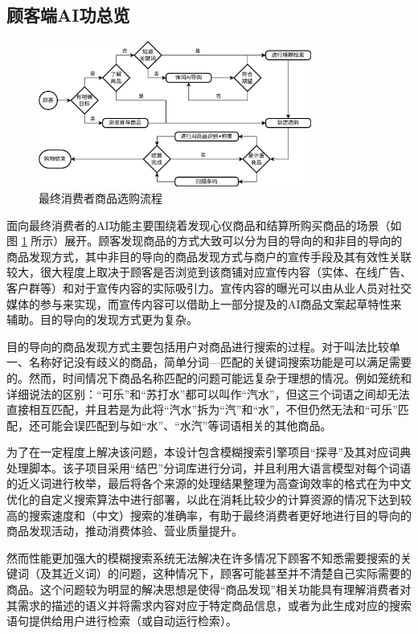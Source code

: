 \subsection{顾客端AI功总览}
\label{sec:guest_features}

\begin{figure}[htbp]
	\centering
	\includegraphics[width=0.8\textwidth]{./imgs/choose-n-buy.png}
	\caption{最终消费者商品选购流程}
	\label{fig:choose-n-buy}
\end{figure}

面向最终消费者的AI功能主要围绕着发现心仪商品和结算所购买商品的场景（如图 \ref{fig:choose-n-buy} 所示）展开。顾客发现商品的方式大致可以分为目的导向的和非目的导向的商品发现方式，其中非目的导向的商品发现方式与商户的宣传手段及其有效性关联较大，很大程度上取决于顾客是否浏览到该商铺对应宣传内容（实体、在线广告、客户群等）和对于宣传内容的实际吸引力。宣传内容的曝光可以由从业人员对社交媒体的参与来实现，而宣传内容可以借助上一部分提及的AI商品文案起草特性来辅助。目的导向的发现方式更为复杂。

目的导向的商品发现方式主要包括用户对商品进行搜索的过程。对于叫法比较单一、名称好记没有歧义的商品，简单分词---匹配的关键词搜索功能是可以满足需要的。然而，时间情况下商品名称匹配的问题可能远复杂于理想的情况。例如笼统和详细说法的区别：“可乐”和“苏打水”都可以叫作“汽水”，但这三个词语之间却无法直接相互匹配，并且若是为此将“汽水”拆为“汽”和“水”，不但仍然无法和“可乐”匹配，还可能会误匹配到与如“水”、“水汽”等词语相关的其他商品。

为了在一定程度上解决该问题，本设计包含模糊搜索引擎项目“探寻”及其对应词典处理脚本。该子项目采用“结巴”分词库\cite{sun_fxsjyjieba_2025,messense_messensejieba-rs_2025}进行分词，并且利用大语言模型对每个词语的近义词进行枚举，最后将各个来源的处理结果整理为高查询效率的格式在为中文优化的自定义搜索算法中进行部署，以此在消耗比较少的计算资源的情况下达到较高的搜索速度和（中文）搜索的准确率，有助于最终消费者更好地进行目的导向的商品发现活动，推动消费体验、营业质量提升。

然而性能更加强大的模糊搜索系统无法解决在许多情况下顾客不知悉需要搜索的关键词（及其近义词）的问题，这种情况下，顾客可能甚至并不清楚自己实际需要的商品。这个问题较为明显的解决思想是使得“商品发现”相关功能具有理解消费者对其需求的描述的语义并将需求内容对应于特定商品信息，或者为此生成对应的搜索语句提供给用户进行检索（或自动运行检索）。

